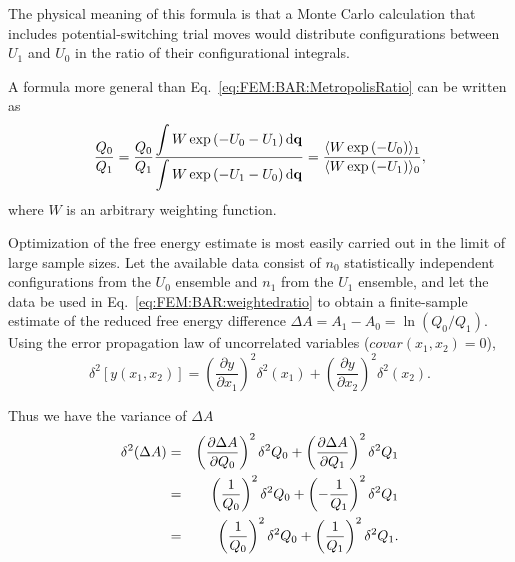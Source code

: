 The physical meaning of this formula is that a Monte Carlo calculation
that includes potential-switching trial moves would distribute configurations
between $U_{1}$ and $U_{0}$ in the ratio of their configurational
integrals. 

A formula more general than Eq.~\ref{eq:FEM:BAR:MetropolisRatio} can be written as
\begin{equation}
	\frac{Q_{0}}{Q_{1}}=\frac{Q_{0}}{Q_{1}}\frac{\displaystyle\int W\exp{(-U_{0}-U_{1})}\mathop{}\!\mathrm{d}\mathbf{{q}}}{\displaystyle\int W\exp{(-U_{1}-U_{0})}\mathop{}\!\mathrm{d}\mathbf{{q}}}=\frac{\langle W\exp{(-U_{0})}\rangle_{1}}{\langle W\exp{(-U_{1})}\rangle_{0}},\label{eq:FEM:BAR:weightedratio}
\end{equation}
where $W$ is an arbitrary weighting function.

Optimization of the free energy estimate is most easily carried out in the limit of large sample sizes. Let the available data consist
of $n_{0}$ statistically independent configurations from the $U_{0}$ ensemble and $n_{1}$ from the $U_{1}$ ensemble, and let the data
be used in Eq.~\ref{eq:FEM:BAR:weightedratio} to obtain a finite-sample estimate of the reduced free energy difference $\Delta A=A_{1}-A_{0}=\ln{(Q_{0}/Q_{1})}$.
Using the error propagation law of uncorrelated variables ($covar(x_1,x_2)=0$),\cite{BerendsenBook2011}
\begin{equation}
	\delta^2\left[y(x_{1},x_{2})\right]=\left(\frac{\partial y}{\partial x_{1}}\right)^{2}\delta^2(x_{1})+\left(\frac{\partial y}{\partial x_{2}}\right)^{2}\delta^2(x_{2}).
\end{equation}

Thus we have the variance of $\Delta A$
\begin{eqnarray}
	\delta^2(\Delta A) & = & \left(\frac{\partial\Delta A}{\partial Q_{0}}\right)^{2}\delta^2Q_0+\left(\frac{\partial\Delta A}{\partial Q_{1}}\right)^{2}\delta^2Q_1\notag\\
	& = & \left(\frac{1}{Q_{0}}\right)^{2}\delta^2Q_0+\left(-\frac{1}{Q_{1}}\right)^{2}\delta^2Q_1\notag\\
	& = & \left(\frac{1}{Q_{0}}\right)^{2}\delta^2Q_0+\left(\frac{1}{Q_{1}}\right)^{2}\delta^2Q_1.
\end{eqnarray}

